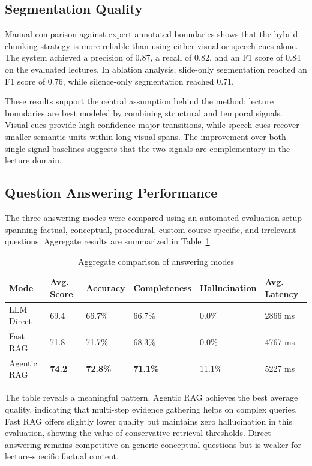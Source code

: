 \subsection{Segmentation Quality}

Manual comparison against expert-annotated boundaries shows that the hybrid chunking strategy is more reliable than using either visual or speech cues alone. The system achieved a precision of 0.87, a recall of 0.82, and an F1 score of 0.84 on the evaluated lectures. In ablation analysis, slide-only segmentation reached an F1 score of 0.76, while silence-only segmentation reached 0.71.

These results support the central assumption behind the method: lecture boundaries are best modeled by combining structural and temporal signals. Visual cues provide high-confidence major transitions, while speech cues recover smaller semantic units within long visual spans. The improvement over both single-signal baselines suggests that the two signals are complementary in the lecture domain.

\subsection{Question Answering Performance}

The three answering modes were compared using an automated evaluation setup spanning factual, conceptual, procedural, custom course-specific, and irrelevant questions. Aggregate results are summarized in Table~\ref{tab:rag-results}.

\begin{table}[H]
    \centering
    \caption{Aggregate comparison of answering modes}
    \label{tab:rag-results}
    \begin{tabular}{@{}llllll@{}}
        \toprule
        \textbf{Mode} & \textbf{Avg. Score} & \textbf{Accuracy} & \textbf{Completeness} & \textbf{Hallucination} & \textbf{Avg. Latency} \\ \midrule
        LLM Direct & 69.4 & 66.7\% & 66.7\% & 0.0\% & 2866 ms \\
        Fast RAG & 71.8 & 71.7\% & 68.3\% & 0.0\% & 4767 ms \\
        Agentic RAG & \textbf{74.2} & \textbf{72.8\%} & \textbf{71.1\%} & 11.1\% & 5227 ms \\ \bottomrule
    \end{tabular}
\end{table}

The table reveals a meaningful pattern. Agentic RAG achieves the best average quality, indicating that multi-step evidence gathering helps on complex queries. Fast RAG offers slightly lower quality but maintains zero hallucination in this evaluation, showing the value of conservative retrieval thresholds. Direct answering remains competitive on generic conceptual questions but is weaker for lecture-specific factual content.

